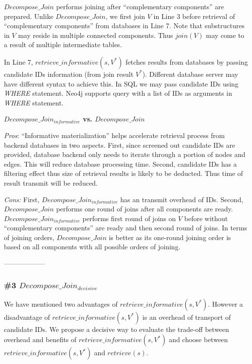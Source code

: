 $Decompose\_Join$ performs joining after ``complementary components'' are prepared. Unlike $Decompose\_Join$, we first join $V$ in Line 3 before retrieval of ``complementary components'' from databases in Line 7. Note that substructures in $V$ may reside in multiple connected components. Thus $join(V)$ may come to a result of multiple intermediate tables.

In Line 7, $retrieve\_{informative}(s, V^{*})$ fetches results from databases by passing candidate IDs information (from join result $V^{*}$). Different database server may have different syntax to achieve this. In SQL we may pass candidate IDs using \textit{WHERE} statement. Neo4j supports query with a list of IDs as arguments in \textit{WHERE} statement.


\textbf{$Decompose\_Join_{informative}$ vs. $Decompose\_Join$}

\textit{Pros}: ``Informative materialization'' helps accelerate retrieval process from backend databases in two aspects. First, since screened out candidate IDs are provided, database backend only needs to iterate through a portion of nodes and edges. This will reduce database processing time. Second, candidate IDs has a filtering effect thus size of retrieval results is likely to be deducted. Thus time of result transmit will be reduced.

\textit{ Cons:} First, $Decompose\_Join_{informative}$ has an transmit overhead of IDs. Second, $Decompose\_Join$ performs one round of joins after all components are ready. $Decompose\_Join_{informative}$ performs first round of joins on $V$ before without ``complementary components'' are ready and then second round of joins. In terms of joining orders, $Decompose\_Join$ is better as its one-round joining order is based on all components with all possible orders of joining.

------------------
\subsubsection{\#3 $Decompose\_Join_{decisive}$}
We have mentioned two advantages of $retrieve\_{informative}(s, V^{*})$. However a disadvantage of $retrieve\_{informative}(s, V^{*})$ is an overhead of transport of candidate IDs. We propose a decisive way to evaluate the trade-off between overhead and benefits of $retrieve\_{informative}(s, V^{*})$ and choose between $retrieve\_{informative}(s, V^{*})$ and $retrieve(s)$.

